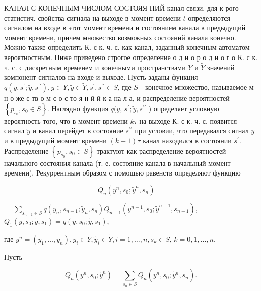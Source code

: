 \documentclass[10pt]{article}
\begin{document}
КАНАЛ С КОНЕЧНЫМ ЧИСЛОМ СОСТОЯЯ НИЙ канал связи, для к-рого статистич. свойства сигнала на выходе в момент времени $t$ определяются сигналом на входе в этот момент времени и состоянием канала в предыдущий момент времени, причем множество возможных состояний канала конечно. Можно также определить К. с к. ч. с. как канал, заданный конечным автоматом вероятностным. Ниже приведено строгое определение о д н о р о д н о г о К. с к. ч. с. с дискретным временем и конечными пространствами $Y$ и $\tilde{Y}$ значений компонент сигналов на входе и выходе. Пусть заданы функция $q\left(y, s^{\prime} ; \tilde{y}, s^{\prime \prime}\right), y \in Y, \tilde{y} \in \tilde{Y}, s^{\prime}, s^{\prime \prime} \in S$, где $S$ - конечное множество, называемое м н о же с тв о м с о с то я н й й к а на л а, и распределение вероятностей $\left\{p_{s_{0}}, s_{0} \in S\right\}$. Наглядно функция $q(y$, $s^{\prime} ; \tilde{y}, s^{\prime \prime}$ ) определяет условную вероятность того, что в момент времени $k \tau$ на выходе К. с к. ч. с. появится сигнал $\tilde{y}$ и канал перейдет в состояние $s^{\prime \prime}$ при условии, что передавался сигнал $y$ и в предыдущий момент времени $(k-1) \tau$ канал находился в состоянии $s^{\prime}$. Распределение $\left\{p_{s_{0}}, s_{0} \in S\right\}$ трактуют как распределение вероятностей начального состояния канала (т. е. состояние канала в начальный момент времени). Рекуррентным образом с помощью равенств определяют функцию



\[

Q_{n}\left(y^{n}, s_{0} ; \tilde{y}^{n}, s_{n}\right)=

\]



$=\sum_{s_{n-1} \in S} q\left(y_{n}, s_{n-1} ; \tilde{y}_{n}, s_{n}\right) Q_{n-1}\left(y^{n-1}, s_{0} ; \tilde{y}^{n-1}, s_{n-1}\right)$, $Q_{1}\left(y, s_{0} ; \tilde{y}, s_{1}\right)=q\left(y, s_{0} ; \tilde{y}, s_{1}\right)$,



где $y^{n}=\left(y_{1}, \ldots, y_{n}\right), y_{i} \in Y, \tilde{y}_{i} \in \tilde{Y}, i=1, \ldots, n, s_{k} \in S$, $k=0,1, \ldots, n$.



Пусть



\[

Q_{n}\left(y^{n}, s_{0} ; \tilde{y}^{n}\right)=\sum_{s_{n} \in S} Q_{n}\left(y^{n}, s_{0} ; \tilde{y^{n}}, s_{n}\right) .

\]
\end{document}
